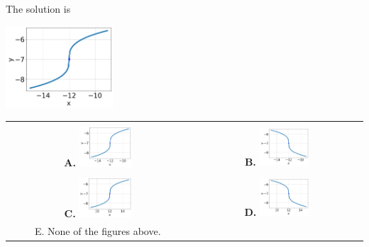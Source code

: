 \documentclass{extbook}[14pt]
\begin{document}
 
 The solution is  
 \begin{center} \includegraphics[width=0.3\textwidth]{../Figures/radicalEquationToGraphBA.png} \end{center}\begin{tabular}{|c|c|} 
\hline 
 & \tabularnewline 
 \textbf{A.} \includegraphics[width=0.3\textwidth]{../Figures/radicalEquationToGraphBA.png} & \textbf{B.} \includegraphics[width=0.3\textwidth]{../Figures/radicalEquationToGraphDA.png} \tabularnewline 
\hline 
 & \tabularnewline 
 \textbf{C.} \includegraphics[width=0.3\textwidth]{../Figures/radicalEquationToGraphAA.png} & \textbf{D.} \includegraphics[width=0.3\textwidth]{../Figures/radicalEquationToGraphCA.png} \tabularnewline 
\hline 
 E. None of the figures above. & \tabularnewline 
\hline 
 \end{tabular} 
 
\end{document}
